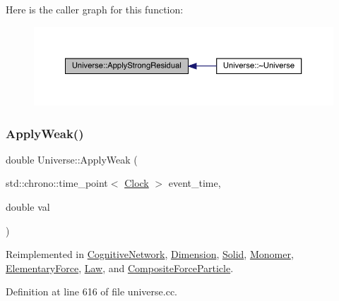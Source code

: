 Here is the caller graph for this function\+:
\nopagebreak
\begin{figure}[H]
\begin{center}
\leavevmode
\includegraphics[width=350pt]{class_universe_af7becebb347be9a85541d96a3eca1ca7_icgraph}
\end{center}
\end{figure}
\mbox{\label{class_universe_a6d1226b3adec3c42a833afdbb6a65a92}} 
\subsubsection{\texorpdfstring{Apply\+Weak()}{ApplyWeak()}}
{\footnotesize\ttfamily double Universe\+::\+Apply\+Weak (\begin{DoxyParamCaption}\item[{std\+::chrono\+::time\+\_\+point$<$ \hyperlink{universe_8h_a0ef8d951d1ca5ab3cfaf7ab4c7a6fd80}{Clock} $>$}]{event\+\_\+time,  }\item[{double}]{val }\end{DoxyParamCaption})\hspace{0.3cm}{\ttfamily [virtual]}}



Reimplemented in \hyperlink{class_cognitive_network_a46a15b24bd61049fa1c4f635268086a1}{Cognitive\+Network}, \hyperlink{class_dimension_a72b8ab8d676b4df6b9a6ef948f5693c9}{Dimension}, \hyperlink{class_solid_a49e35bf258104b7bce225dc21058affb}{Solid}, \hyperlink{class_monomer_a176a1a4dfed1eaddc6637bbfd2660aba}{Monomer}, \hyperlink{class_elementary_force_aabf66a859e6e808a65c6929cd16f7597}{Elementary\+Force}, \hyperlink{class_law_a96ddd42403e3665c6070283ac201658d}{Law}, and \hyperlink{class_composite_force_particle_a1fd171a0c6fab0cbf9a45a0d24607bde}{Composite\+Force\+Particle}.



Definition at line 616 of file universe.\+cc.

